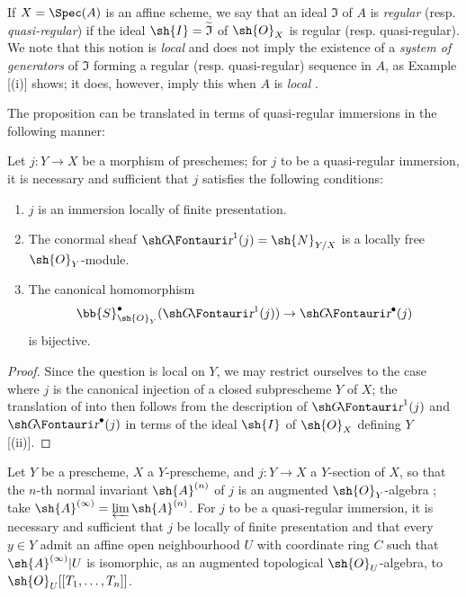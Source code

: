 \begin{env}[16.9.7]
\label{IV.16.9.7}
If $X = \Spec(A)$ is an affine scheme, we say that an ideal $\mathfrak{I}$ of $A$ is \emph{regular} (resp. \emph{quasi-regular}) if the ideal $\sh{I} = \widetilde{\mathfrak{I}}$ of $\sh{O}_X$ is regular (resp. quasi-regular).
We note that this notion is \emph{local} and does not imply the existence of a \emph{system of generators} of $\mathfrak{I}$ forming a regular (resp. quasi-regular) sequence in $A$, as Example [(i)] shows;
it does, however, imply this when $A$ is \emph{local} .

The proposition  can be translated in terms of quasi-regular immersions in the following manner:
\end{env}

\begin{proposition}[16.9.8]
\label{IV.16.9.8}
Let $j:Y \to X$ be a morphism of preschemes;
for $j$ to be a quasi-regular immersion, it is necessary and sufficient that $j$ satisfies the following conditions:
\begin{enumerate}
  \item[(i)] $j$ is an immersion locally of finite presentation.
  \item[(ii)] The conormal sheaf $\shGr^1(j) = \sh{N}_{Y/X}$  is a locally free $\sh{O}_Y$-module.
  \item[(iii)] The canonical homomorphism
  \[
    \bb{S}_{\sh{O}_Y}^\bullet(\shGr^1(j)) \to \shGr^\bullet(j)
  \]
   is bijective.
\end{enumerate}
\end{proposition}

\begin{proof}
Since the question is local on $Y$, we may restrict ourselves to the case where $j$ is the canonical injection of a closed subprescheme $Y$ of $X$; the translation of  into  then follows from the description of $\shGr^1(j)$ and $\shGr^\bullet(j)$ in terms of the ideal $\sh{I}$ of $\sh{O}_X$ defining $Y$ [(ii)].
\end{proof}

\begin{corollary}[16.9.9]
\label{IV.16.9.9}
Let $Y$ be a prescheme, $X$ a $Y$-prescheme, and $j:Y \to X$ a $Y$-section of $X$, so that the $n$-th normal invariant $\sh{A}^{(n)}$ of $j$  is an augmented $\sh{O}_Y$-algebra ;
take $\sh{A}^{(\infty)} = \varprojlim \sh{A}^{(n)}$.
For $j$ to be a quasi-regular immersion, it is necessary and sufficient that $j$ be locally of finite presentation and that every $y \in Y$ admit an affine open neighbourhood $U$ with coordinate ring $C$ such that $\sh{A}^{(\infty)}|U$ is isomorphic, as an augmented topological $\sh{O}_U$-algebra, to $\sh{O}_U[[T_1, \dots, T_n]]$.
\end{corollary}

